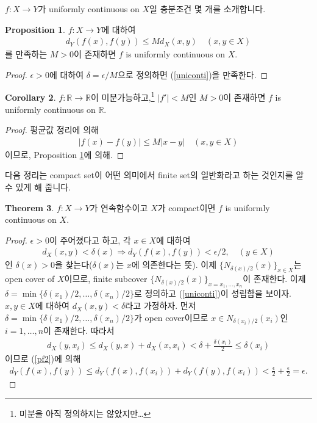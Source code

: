 \documentclass[12pt]{article}
\theoremstyle{definition}
\newtheorem{thm}{Theorem}[section]
\newtheorem{cor}[thm]{Corollary}
\newtheorem{prop}[thm]{Proposition}
\def\RR{\mathbb{R}}
\def\eps{\epsilon}
\newcommand{\abs}[1]{\left\vert#1\right\vert}
\begin{document}
\(f: X \rightarrow Y\)가 uniformly continuous on \(X\)일 충분조건 몇 개를 소개합니다.

\begin{prop} \label{Lip}
	\(f: X \rightarrow Y\)에 대하여
	\begin{gather*}
		d_Y (f(x), f(y)) \le M d_X (x, y) \quad (x, y \in X)
	\end{gather*}
	를 만족하는 \(M > 0\)이 존재하면 \(f\) is uniformly continuous on \(X\).
\end{prop}
\begin{proof}
	\(\eps > 0\)에 대하여 \(\delta = \eps / M\)으로 정의하면 (\ref{uniconti})을 만족한다.
\end{proof}

\begin{cor} \label{diff}
	\(f: \RR \rightarrow \RR\)이 미분가능하고,\footnote{미분을 아직 정의하지는 않았지만\ldots} \(\abs{f'} < M\)인 \(M > 0\)이 존재하면 \(f\) is uniformly continuous on \(\RR\). 
\end{cor}
\begin{proof}
	평균값 정리에 의해
	\begin{gather*}
		\abs{f(x) - f(y)} \le M \abs{x - y} \quad (x, y \in X)
	\end{gather*}
	이므로, Proposition \ref{Lip}에 의해.
\end{proof}

다음 정리는 compact set이 어떤 의미에서 finite set의 일반화라고 하는 것인지를 알 수 있게 해 줍니다.

\begin{thm}
	\(f: X \rightarrow Y\)가 연속함수이고 \(X\)가 compact이면 \(f\) is uniformly continuous on \(X\).
\end{thm}
\begin{proof}
	\(\eps > 0\)이 주어졌다고 하고, 각 \(x \in X\)에 대하여
	\begin{gather*} \label{pf2}
		d_X (x, y) < \delta (x) \Longrightarrow d_Y (f(x), f(y)) < \eps / 2, \quad (y \in X)
	\end{gather*}
	인 \(\delta(x) > 0\)을 찾는다(\(\delta(x)\)는 \(x\)에 의존한다는 뜻). 이제 \(\{N_{\delta(x) / 2} (x)\}_{x \in X}\)는 open cover of \(X\)이므로, finite subcover \(\{N_{\delta(x) / 2} (x)\}_{x = x_1, \ldots, x_n}\)이 존재한다. 이제 \(\delta = \min\{\delta(x_1) / 2, \ldots, \delta(x_n) / 2\}\)로 정의하고 (\ref{uniconti})이 성립함을 보이자.\\
	\(x, y \in X\)에 대하여 \(d_X (x, y) < \delta\)라고 가정하자. 먼저 \(\delta = \min\{\delta(x_1) / 2, \ldots, \delta(x_n) / 2\}\)가 open cover이므로 \(x \in N_{\delta(x_i) / 2} (x_i)\)인 \(i = 1, \ldots, n\)이 존재한다. 따라서
	\begin{gather*}
		d_X (y, x_i) \le d_X (y, x) + d_X (x, x_i) < \delta + \frac{\delta(x_i)}{2} \le \delta(x_i)
	\end{gather*}
	이므로 (\ref{pf2})에 의해
	\begin{gather*}
		d_Y (f(x), f(y)) \le d_Y (f(x), f(x_i)) + d_Y (f(y), f(x_i)) < \frac{\eps}{2} + \frac{\eps}{2} = \eps.
	\end{gather*}
\end{proof}
\end{document}
